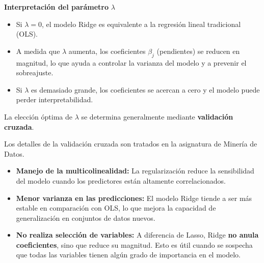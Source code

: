 \documentclass[
  letterpaper,
  DIV=11,
  numbers=noendperiod]{scrreprt}
\providecommand{\tightlist}{%
  \setlength{\itemsep}{0pt}\setlength{\parskip}{0pt}}
\begin{document}
\textbf{Interpretación del parámetro} \(\lambda\)

\begin{itemize}
\tightlist
\item
  Si \(\lambda = 0\), el modelo Ridge es equivalente a la regresión
  lineal tradicional (OLS).
\item
  A medida que \(\lambda\) aumenta, los coeficientes \(\beta_j\)
  (pendientes) se reducen en magnitud, lo que ayuda a controlar la
  varianza del modelo y a prevenir el sobreajuste.
\item
  Si \(\lambda\) es demasiado grande, los coeficientes se acercan a cero
  y el modelo puede perder interpretabilidad.
\end{itemize}

La elección óptima de \(\lambda\) se determina generalmente mediante
\textbf{validación cruzada}.

\begin{tcolorbox}[enhanced jigsaw, leftrule=.75mm, breakable, colbacktitle=quarto-callout-caution-color!10!white, bottomrule=.15mm, colframe=quarto-callout-caution-color-frame, toprule=.15mm, colback=white, coltitle=black, bottomtitle=1mm, left=2mm, title=\textcolor{quarto-callout-caution-color}{\faFire}\hspace{0.5em}{Aviso}, opacityback=0, arc=.35mm, opacitybacktitle=0.6, toptitle=1mm, titlerule=0mm, rightrule=.15mm]

Los detalles de la validación cruzada son tratados en la asignatura de
Minería de Datos.

\end{tcolorbox}

\begin{tcolorbox}[enhanced jigsaw, leftrule=.75mm, breakable, colbacktitle=quarto-callout-note-color!10!white, bottomrule=.15mm, colframe=quarto-callout-note-color-frame, toprule=.15mm, colback=white, coltitle=black, bottomtitle=1mm, left=2mm, title=\textcolor{quarto-callout-note-color}{\faInfo}\hspace{0.5em}{Propiedades Clave}, opacityback=0, arc=.35mm, opacitybacktitle=0.6, toptitle=1mm, titlerule=0mm, rightrule=.15mm]

\begin{itemize}
\item
  \textbf{Manejo de la multicolinealidad:} La regularización reduce la
  sensibilidad del modelo cuando los predictores están altamente
  correlacionados.
\item
  \textbf{Menor varianza en las predicciones:} El modelo Ridge tiende a
  ser más estable en comparación con OLS, lo que mejora la capacidad de
  generalización en conjuntos de datos nuevos.
\item
  \textbf{No realiza selección de variables:} A diferencia de Lasso,
  Ridge \textbf{no anula coeficientes}, sino que reduce su magnitud.
  Esto es útil cuando se sospecha que todas las variables tienen algún
  grado de importancia en el modelo.
\end{itemize}

\end{tcolorbox}
\end{document}
